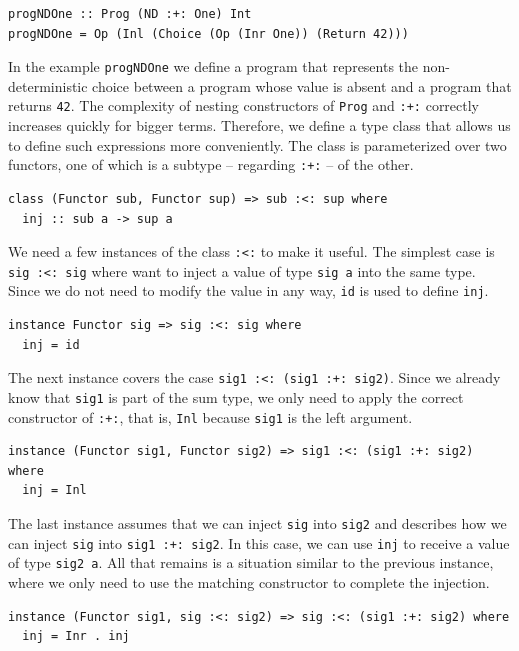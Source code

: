 \documentclass[a4paper, 11pt, fleqn, twoside]{scrreprt}
\newcommand{\hinl}[1]{\texttt{#1}}
\begin{document}
\begin{verbatim}
progNDOne :: Prog (ND :+: One) Int
progNDOne = Op (Inl (Choice (Op (Inr One)) (Return 42)))
\end{verbatim}

In the example \hinl{progNDOne} we define a program that represents the non-deterministic choice between a program whose value is absent and a program that returns \hinl{42}.
The complexity of nesting constructors of \hinl{Prog} and \hinl{:+:} correctly increases quickly for bigger terms.
Therefore, we define a type class that allows us to define such expressions more conveniently.
The class is parameterized over two functors, one of which is a subtype -- regarding \hinl{:+:} -- of the other.

\begin{verbatim}
class (Functor sub, Functor sup) => sub :<: sup where
  inj :: sub a -> sup a
\end{verbatim}

We need a few instances of the class \hinl{:<:} to make it useful.
The simplest case is \hinl{sig :<: sig} where want to inject a value of type \hinl{sig a} into the same type.
Since we do not need to modify the value in any way, \hinl{id} is used to define \hinl{inj}.

\begin{verbatim}
instance Functor sig => sig :<: sig where
  inj = id  
\end{verbatim}

The next instance covers the case \hinl{sig1 :<: (sig1 :+: sig2)}.
Since we already know that \hinl{sig1} is part of the sum type, we only need to apply the correct constructor of \hinl{:+:}, that is, \hinl{Inl} because \hinl{sig1} is the left argument.

\begin{verbatim}
instance (Functor sig1, Functor sig2) => sig1 :<: (sig1 :+: sig2) where
  inj = Inl
\end{verbatim}

The last instance assumes that we can inject \hinl{sig} into \hinl{sig2} and describes how we can inject \hinl{sig} into \hinl{sig1 :+: sig2}.
In this case, we can use \hinl{inj} to receive a value of type \hinl{sig2 a}.
All that remains is a situation similar to the previous instance, where we only need to use the matching constructor to complete the injection.
 
\begin{verbatim}
instance (Functor sig1, sig :<: sig2) => sig :<: (sig1 :+: sig2) where
  inj = Inr . inj
\end{verbatim}
\end{document}
